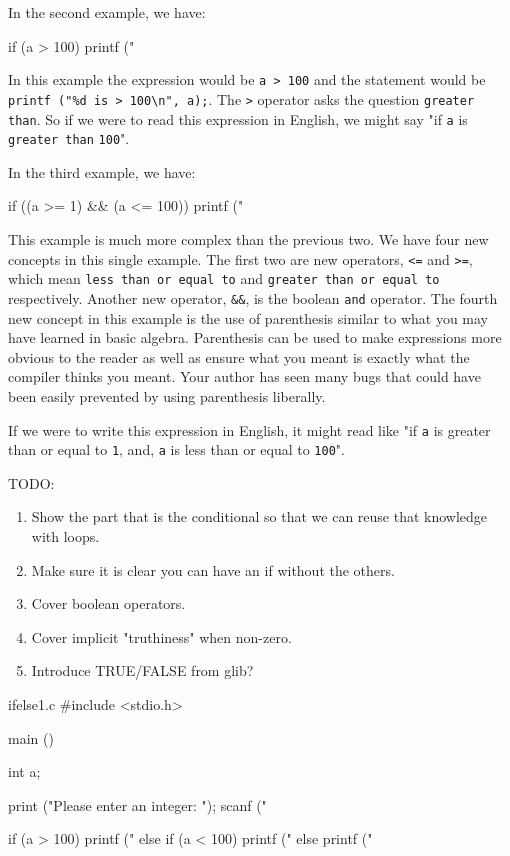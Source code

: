 In the second example, we have:

\begin{code}{}
if (a > 100) {
    printf ("%
}
\end{code}

In this example the expression would be \verb|a > 100| and the statement
would be \verb|printf ("%d is > 100\n", a);|. The \verb|>| operator asks
the question \verb|greater than|. So if we were to read this expression in
English, we might say "if \verb|a| is \verb|greater than| \verb|100|".

In the third example, we have:

\begin{code}{}
if ((a >= 1) && (a <= 100)) {
    printf ("%
}
\end{code}

This example is much more complex than the previous two.  We have four new
concepts in this single example. The first two are new operators, \verb|<=| and
\verb|>=|, which mean \verb|less than or equal to| and \verb|greater than or equal to|
respectively. Another new operator, \verb|&&|, is the boolean
\verb|and| operator. The fourth new concept in this example is the use of
parenthesis similar to what you may have learned in basic algebra.  Parenthesis
can be used to make expressions more obvious to the reader as well as ensure
what you meant is exactly what the compiler thinks you meant. Your author has
seen many bugs that could have been easily prevented by using parenthesis
liberally.

If we were to write this expression in English, it might read like "if \verb|a|
is greater than or equal to \verb|1|, and, \verb|a| is less than or equal to
\verb|100|".

TODO:

\begin{enumerate}
\item Show the part that is the conditional so that we can reuse that
      knowledge with loops.
\item Make sure it is clear you can have an if without the others.
\item Cover boolean operators.
\item Cover implicit "truthiness" when non-zero.
\item Introduce TRUE/FALSE from glib?
\end{enumerate}

\begin{code}{ifelse1.c}
#include <stdio.h>

main ()
{
    int a;

    print ("Please enter an integer:  ");
    scanf ("%

    if (a > 100) {
        printf ("%
    } else if (a < 100) {
        printf ("%
    } else {
        printf ("%
    }
}
\end{code}


